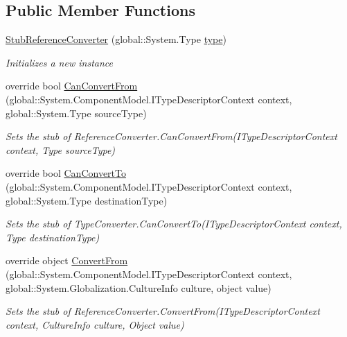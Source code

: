 \subsection*{Public Member Functions}
\begin{DoxyCompactItemize}
\item 
\hyperlink{class_system_1_1_component_model_1_1_fakes_1_1_stub_reference_converter_ac278847cbb423d73b56d0aa94ff296d3}{Stub\-Reference\-Converter} (global\-::\-System.\-Type \hyperlink{jquery-1_810_82-vsdoc_8js_a3940565e83a9bfd10d95ffd27536da91}{type})
\begin{DoxyCompactList}\small\item\em Initializes a new instance\end{DoxyCompactList}\item 
override bool \hyperlink{class_system_1_1_component_model_1_1_fakes_1_1_stub_reference_converter_a3aef0e75ee9f755780086ba090cb85e1}{Can\-Convert\-From} (global\-::\-System.\-Component\-Model.\-I\-Type\-Descriptor\-Context context, global\-::\-System.\-Type source\-Type)
\begin{DoxyCompactList}\small\item\em Sets the stub of Reference\-Converter.\-Can\-Convert\-From(\-I\-Type\-Descriptor\-Context context, Type source\-Type)\end{DoxyCompactList}\item 
override bool \hyperlink{class_system_1_1_component_model_1_1_fakes_1_1_stub_reference_converter_a8fae0747333501ee7be94efba26da83a}{Can\-Convert\-To} (global\-::\-System.\-Component\-Model.\-I\-Type\-Descriptor\-Context context, global\-::\-System.\-Type destination\-Type)
\begin{DoxyCompactList}\small\item\em Sets the stub of Type\-Converter.\-Can\-Convert\-To(\-I\-Type\-Descriptor\-Context context, Type destination\-Type)\end{DoxyCompactList}\item 
override object \hyperlink{class_system_1_1_component_model_1_1_fakes_1_1_stub_reference_converter_a57c010c2f1fe88dfd11d5044532b462e}{Convert\-From} (global\-::\-System.\-Component\-Model.\-I\-Type\-Descriptor\-Context context, global\-::\-System.\-Globalization.\-Culture\-Info culture, object value)
\begin{DoxyCompactList}\small\item\em Sets the stub of Reference\-Converter.\-Convert\-From(\-I\-Type\-Descriptor\-Context context, Culture\-Info culture, Object value)\end{DoxyCompactList}\item 

\end{DoxyCompactItemize}

